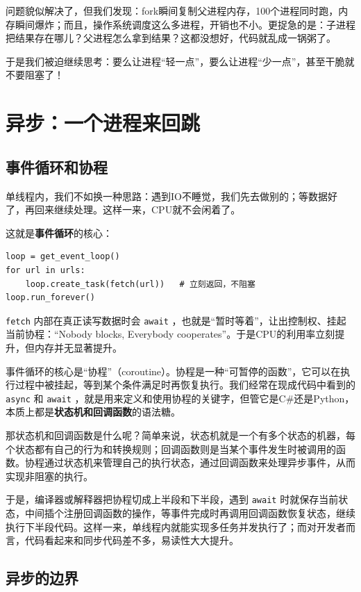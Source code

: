 问题貌似解决了，但我们发现：fork瞬间复制父进程内存，100个进程同时跑，内存瞬间爆炸；而且，操作系统调度这么多进程，开销也不小。更捉急的是：子进程把结果存在哪儿？父进程怎么拿到结果？这都没想好，代码就乱成一锅粥了。

于是我们被迫继续思考：要么让进程“轻一点”，要么让进程“少一点”，甚至干脆就不要阻塞了！

\section{异步：一个进程来回跳}

\subsection{事件循环和协程}

单线程内，我们不如换一种思路：遇到IO不睡觉，我们先去做别的；等数据好了，再回来继续处理。这样一来，CPU就不会闲着了。

这就是\textbf{事件循环}的核心：
\begin{verbatim}
loop = get_event_loop()
for url in urls:
    loop.create_task(fetch(url))   # 立刻返回，不阻塞
loop.run_forever()
\end{verbatim}

 \texttt{fetch} 内部在真正读写数据时会 \texttt{await} ，也就是“暂时等着”，让出控制权、挂起当前协程：“Nobody blocks, Everybody cooperates”。于是CPU的利用率立刻提升，但内存并无显著提升。

事件循环的核心是“协程”（coroutine）。协程是一种“可暂停的函数”，它可以在执行过程中被挂起，等到某个条件满足时再恢复执行。我们经常在现成代码中看到的 \texttt{async} 和 \texttt{await} ，就是用来定义和使用协程的关键字，但管它是C\#还是Python，本质上都是\textbf{状态机和回调函数}的语法糖。

那状态机和回调函数是什么呢？简单来说，状态机就是一个有多个状态的机器，每个状态都有自己的行为和转换规则；回调函数则是当某个事件发生时被调用的函数。协程通过状态机来管理自己的执行状态，通过回调函数来处理异步事件，从而实现非阻塞的执行。

于是，编译器或解释器把协程切成上半段和下半段，遇到 \texttt{await} 时就保存当前状态，中间插个注册回调函数的操作，等事件完成时再调用回调函数恢复状态，继续执行下半段代码。这样一来，单线程内就能实现多任务并发执行了；而对开发者而言，代码看起来和同步代码差不多，易读性大大提升。

\subsection{异步的边界}

